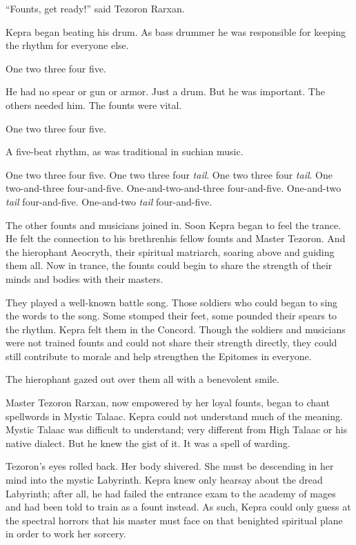 \documentclass
  [a4paper,
   12pt,
   oneside
  ]%
  {article}
\newcommand{\drum}[1]{\textsf{#1}}
\begin{document}
``Founts, get ready!'' said Tezoron Rarxan. 

Kepra began beating his drum. As bass drummer he was responsible for keeping the rhythm for everyone else.

\drum{One two three four five.} 

He had no spear or gun or armor. Just a drum. 
But he was important.
The others needed him. 
The founts were vital. 

\drum{One two three four five.}

A five-beat rhythm, as was traditional in suchian music. 

\drum{%
    One two three four five. One two three four \emph{tail}. One two three four \emph{tail}. One two-and-three four-and-five. One-and-two-and-three four-and-five. One-and-two \emph{tail} four-and-five. One-and-two \emph{tail} four-and-five.}

The other founts and musicians joined in. 
Soon Kepra began to feel the trance. 
He felt the connection to his brethren\dash{}his fellow founts and Master Tezoron. And the hierophant Aeocryth, their spiritual matriarch, soaring above and guiding them all. 
Now in trance, the founts could begin to share the strength of their minds and bodies with their masters.

They played a well-known battle song. 
Those soldiers who could began to sing the words to the song. Some stomped their feet, some pounded their spears to the rhythm. Kepra felt them in the Concord. Though the soldiers and musicians were not trained founts and could not share their strength directly, they could still contribute to morale and help strengthen the Epitomes in everyone.

The hierophant gazed out over them all with a benevolent smile.

Master Tezoron Rarxan, now empowered by her loyal founts, began to chant spellwords in Mystic Talaac. 
Kepra could not understand much of the meaning. Mystic Talaac was difficult to understand; very different from High Talaac or his native dialect.
But he knew the gist of it. It was a spell of warding. 

Tezoron’s eyes rolled back. Her body shivered. She must be descending in her mind into the mystic Labyrinth. Kepra knew only hearsay about the dread Labyrinth; after all, he had failed the entrance exam to the academy of mages and had been told to train as a fount instead. 
As such, Kepra could only guess at the spectral horrors that his master must face on that benighted spiritual plane in order to work her sorcery. 
\end{document}
